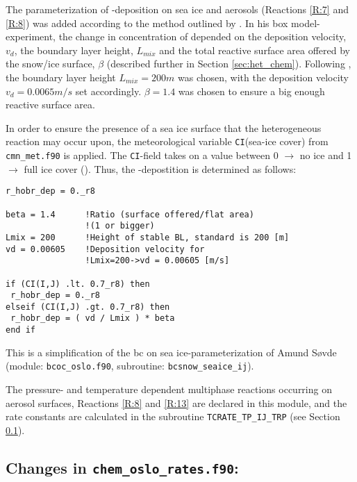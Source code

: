 The parameterization of -deposition on sea ice and aerosols (Reactions \ref{R:7} and \ref{R:8}) was added according to the method outlined by \cite{CAO}. In his box model-experiment, the change in concentration of  depended on the deposition velocity, $v_d$, the boundary layer height, $L_{mix}$ and the total reactive surface area offered by the snow/ice surface, $\beta$ (described further in Section \ref{sec:het_chem}). Following \cite{CAO}, the boundary layer height $L_{mix} = 200 m$ was chosen, with  the deposition velocity $v_d = 0.0065 m/s$ set accordingly. $\beta = 1.4$ was chosen to ensure a big enough reactive surface area. 

\medskip 

In order to ensure the presence of a sea ice surface that the heterogeneous reaction may occur upon, the meteorological variable \texttt{CI}(sea-ice cover) from \texttt{cmn\_met.f90} is applied. The \texttt{CI}-field takes on a value between 0 $\rightarrow$ no ice and 1 $\rightarrow$ full ice cover (\cite{SovdeManual}). Thus, the -depostition is determined as follows: 

\begin{lstlisting}
r_hobr_dep = 0._r8

beta = 1.4      !Ratio (surface offered/flat area)
                !(1 or bigger)
Lmix = 200      !Height of stable BL, standard is 200 [m]
vd = 0.00605    !Deposition velocity for 
                !Lmix=200->vd = 0.00605 [m/s]

if (CI(I,J) .lt. 0.7_r8) then
 r_hobr_dep = 0._r8
elseif (CI(I,J) .gt. 0.7_r8) then
 r_hobr_dep = ( vd / Lmix ) * beta
end if
\end{lstlisting}

This is a simplification of the \acrshort{bc} on sea ice-parameterization of Amund Søvde (module: \texttt{bcoc\_oslo.f90}, subroutine: \texttt{bcsnow\_seaice\_ij}). 

\medskip 

 
The pressure- and temperature dependent multiphase reactions occurring on aerosol surfaces, Reactions \ref{R:8} and \ref{R:13} are declared in this module, and the rate constants are calculated in the subroutine \texttt{TCRATE\_TP\_IJ\_TRP} (see Section \ref{sec:chem_oslo_rates}). 



\subsection{Changes in \texttt{chem\_oslo\_rates.f90}:}\label{sec:chem_oslo_rates}



